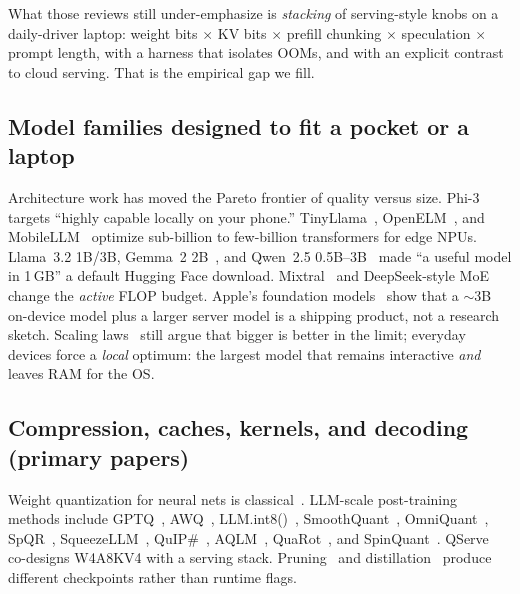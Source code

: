 What those reviews still under-emphasize is \emph{stacking} of serving-style knobs on a daily-driver laptop: weight bits $\times$ KV bits $\times$ prefill chunking $\times$ speculation $\times$ prompt length, with a harness that isolates OOMs, and with an explicit contrast to cloud serving. That is the empirical gap we fill.

\subsection{Model families designed to fit a pocket or a laptop}

Architecture work has moved the Pareto frontier of quality versus size. Phi-3~\citep{abdin2024phi3} targets ``highly capable locally on your phone.'' TinyLlama~\citep{zhang2024tinyllama}, OpenELM~\citep{mehta2024openelm}, and MobileLLM~\citep{liu2024mobilellm} optimize sub-billion to few-billion transformers for edge NPUs. Llama~3.2 1B/3B, Gemma~2 2B~\citep{team2024gemma2}, and Qwen~2.5 0.5B--3B~\citep{qwen2024qwen25,yang2024qwen2} made ``a useful model in 1\,GB'' a default Hugging Face download. Mixtral~\citep{jiang2024mixtral} and DeepSeek-style MoE~\citep{liu2024deepseek,deepseek2024v3} change the \emph{active} FLOP budget. Apple's foundation models~\citep{gunter2024apple} show that a $\sim$3B on-device model plus a larger server model is a shipping product, not a research sketch. Scaling laws~\citep{kaplan2020scaling,hoffmann2022chinchilla,wei2022emergent} still argue that bigger is better in the limit; everyday devices force a \emph{local} optimum: the largest model that remains interactive \emph{and} leaves RAM for the OS.

\subsection{Compression, caches, kernels, and decoding (primary papers)}

Weight quantization for neural nets is classical~\citep{jacob2018quantization,han2015deep}. LLM-scale post-training methods include GPTQ~\citep{frantar2022gptq}, AWQ~\citep{lin2023awq}, LLM.int8()~\citep{dettmers2022llmint8}, SmoothQuant~\citep{xiao2023smoothquant}, OmniQuant~\citep{shao2024omniquant}, SpQR~\citep{frantar2023spqr}, SqueezeLLM~\citep{kim2023squeezellm}, QuIP\#~\citep{tseng2024quip}, AQLM~\citep{egiazarian2024aqlm}, QuaRot~\citep{ashkboos2024quarot}, and SpinQuant~\citep{che2024spinquant}. QServe~\citep{lin2024qserve} co-designs W4A8KV4 with a serving stack. Pruning~\citep{frantar2023sparsegpt,ma2023llmpruner} and distillation~\citep{hinton2015distilling,sanh2019distilbert} produce different checkpoints rather than runtime flags.

